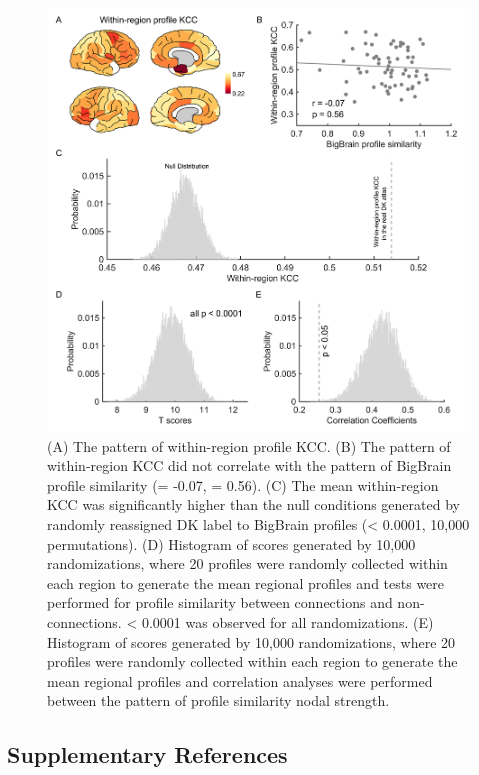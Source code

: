 \begin{refsection}
\begin{figure}[H]
    \centering
    \includegraphics[width=\linewidth]{images/bbFigureS4.png}   
    \caption{(A) The pattern of within-region profile KCC. (B) The pattern of within-region KCC did not correlate with the pattern of BigBrain profile similarity (\rval = -0.07, \pval = 0.56). (C) The mean within-region KCC was significantly higher than the null conditions generated by randomly reassigned DK label to BigBrain profiles (\pval < 0.0001, 10,000 permutations). (D) Histogram of \tval scores generated by 10,000 randomizations, where 20 profiles were randomly collected within each region to generate the mean regional profiles and \tval tests were performed for profile similarity between connections and non-connections. \pval < 0.0001 was observed for all randomizations. (E) Histogram of \rval scores generated by 10,000 randomizations, where 20 profiles were randomly collected within each region to generate the mean regional profiles and correlation analyses were performed between the pattern of profile similarity nodal strength.}
    \label{bigbrainFigS4}
\end{figure}

\subsection*{Supplementary References}
\printbibliography[heading=none]

\end{refsection}



